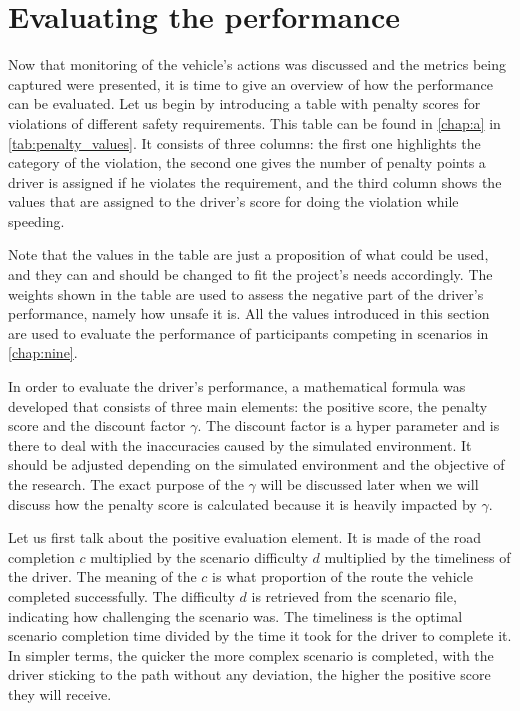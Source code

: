 \section{Evaluating the performance} \label{sect-6.3}

Now that monitoring of the vehicle's actions was discussed and the metrics being captured were presented, it is time to give an overview of how the performance can be evaluated. Let us begin by introducing a table with penalty scores for violations of different safety requirements. This table can be found in \autoref{chap:a} in \autoref{tab:penalty_values}. It consists of three columns: the first one highlights the category of the violation, the second one gives the number of penalty points a driver is assigned if he violates the requirement, and the third column shows the values that are assigned to the driver's score for doing the violation while speeding.

Note that the values in the table are just a proposition of what could be used, and they can and should be changed to fit the project's needs accordingly. The weights shown in the table are used to assess the negative part of the driver's performance, namely how unsafe it is.
All the values introduced in this section are used to evaluate the performance of participants competing in scenarios in \autoref{chap:nine}.

In order to evaluate the driver's performance, a mathematical formula was developed that consists of three main elements: the positive score, the penalty score and the discount factor $\gamma$. The discount factor is a hyper parameter and is there to deal with the inaccuracies caused by the simulated environment. It should be adjusted depending on the simulated environment and the objective of the research. The exact purpose of the $\gamma$ will be discussed later when we will discuss how the penalty score is calculated because it is heavily impacted by $\gamma$.


Let us first talk about the positive evaluation element. It is made of the road completion $c$ multiplied by the scenario difficulty $d$ multiplied by the timeliness of the driver. The meaning of the $c$ is what proportion of the route the vehicle completed successfully. The difficulty $d$ is retrieved from the scenario file, indicating how challenging the scenario was. The timeliness is the optimal scenario completion time divided by the time it took for the driver to complete it. In simpler terms, the quicker the more complex scenario is completed, with the driver sticking to the path without any deviation, the higher the positive score they will receive.



